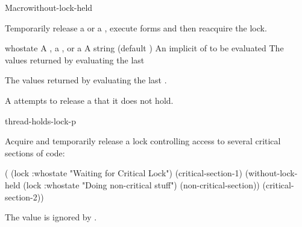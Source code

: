 \begin{functiondoc}{Macro}{without-lock-held}{\code{(} 
    \code{)}
    \superstar{} 
    \returns{} \superstar}
%
%
%
%

\fnsyntax

\fnpurpose Temporarily release a  or a ,
execute forms and then reacquire the lock.

\fnpackage {}

\fnmodule {}

\fnargs
\begin{args}{whostate}
\arg[lock] A , a , or a 
\arg[whostate] A string (default )
\arg[forms] An implicit  of  to be evaluated
\arg[results] The values returned by evaluating the last 
\end{args}

\fnreturns The values returned by evaluating the last .

\fnerrors A  attempts to release a  that it does not
hold.
  
\begin{alsos}{thread-holds-lock-p}
\end{alsos}

\fnexample 
%
%
%
Acquire and temporarily release a lock controlling access to several
critical sections of code:
%
\W\supp
\begin{example}
  ( (lock :whostate "Waiting for Critical Lock")
    (critical-section-1)
    (without-lock-held (lock :whostate "Doing non-critical stuff")
      (non-critical-section))
    (critical-section-2))
\end{example}

\fnnote The  value is ignored by
.

\end{functiondoc}

